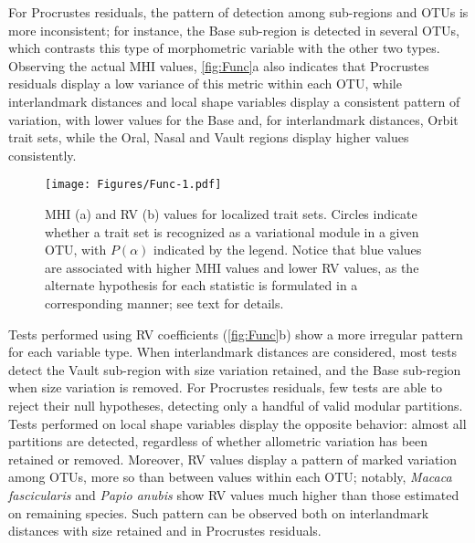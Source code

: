 \documentclass[12pt,]{article}
\begin{document}
For Procrustes residuals, the pattern of detection among sub-regions and
OTUs is more inconsistent; for instance, the Base sub-region is detected
in several OTUs, which contrasts this type of morphometric variable with
the other two types. Observing the actual MHI values,
\autoref{fig:Func}a also indicates that Procrustes residuals display a
low variance of this metric within each OTU, while interlandmark
distances and local shape variables display a consistent pattern of
variation, with lower values for the Base and, for interlandmark
distances, Orbit trait sets, while the Oral, Nasal and Vault regions
display higher values consistently.

\begin{figure}[htbp]
\centering
\texttt{[image: Figures/Func-1.pdf]}
\caption{MHI (a) and RV (b) values for localized trait sets. Circles
indicate whether a trait set is recognized as a variational module in a
given OTU, with $P(\alpha)$ indicated by the legend. Notice that blue
values are associated with higher MHI values and lower RV values, as the
alternate hypothesis for each statistic is formulated in a corresponding
manner; see text for details. \label{fig:Func}}
\end{figure}

Tests performed using RV coefficients (\autoref{fig:Func}b) show a more
irregular pattern for each variable type. When interlandmark distances
are considered, most tests detect the Vault sub-region with size
variation retained, and the Base sub-region when size variation is
removed. For Procrustes residuals, few tests are able to reject their
null hypotheses, detecting only a handful of valid modular partitions.
Tests performed on local shape variables display the opposite behavior:
almost all partitions are detected, regardless of whether allometric
variation has been retained or removed. Moreover, RV values display a
pattern of marked variation among OTUs, more so than between values
within each OTU; notably, \emph{Macaca fascicularis} and \emph{Papio
anubis} show RV values much higher than those estimated on remaining
species. Such pattern can be observed both on interlandmark distances
with size retained and in Procrustes residuals.
\end{document}
